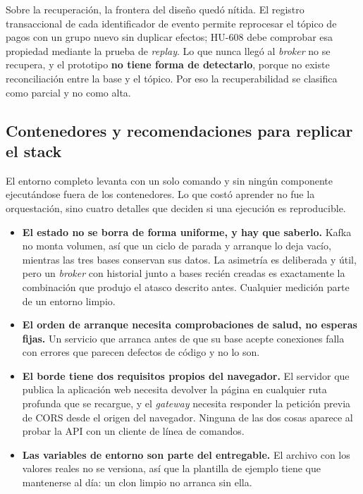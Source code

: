 \documentclass[12pt,a4paper]{article}
\begin{document}
Sobre la recuperación, la frontera del diseño quedó nítida. El registro transaccional de cada identificador de evento permite reprocesar el tópico de pagos con un grupo nuevo sin duplicar efectos; HU-608 debe comprobar esa propiedad mediante la prueba de \textit{replay}. Lo que nunca llegó al \textit{broker} no se recupera, y el prototipo \textbf{no tiene forma de detectarlo}, porque no existe reconciliación entre la base y el tópico. Por eso la recuperabilidad se clasifica como parcial y no como alta.

\subsection{Contenedores y recomendaciones para replicar el stack}

El entorno completo levanta con un solo comando y sin ningún componente ejecutándose fuera de los contenedores. Lo que costó aprender no fue la orquestación, sino cuatro detalles que deciden si una ejecución es reproducible.

\begin{itemize}[leftmargin=*]
    \item \textbf{El estado no se borra de forma uniforme, y hay que saberlo.} Kafka no monta volumen, así que un ciclo de parada y arranque lo deja vacío, mientras las tres bases conservan sus datos. La asimetría es deliberada y útil, pero un \textit{broker} con historial junto a bases recién creadas es exactamente la combinación que produjo el atasco descrito antes. Cualquier medición parte de un entorno limpio.
    \item \textbf{El orden de arranque necesita comprobaciones de salud, no esperas fijas.} Un servicio que arranca antes de que su base acepte conexiones falla con errores que parecen defectos de código y no lo son.
    \item \textbf{El borde tiene dos requisitos propios del navegador.} El servidor que publica la aplicación web necesita devolver la página en cualquier ruta profunda que se recargue, y el \textit{gateway} necesita responder la petición previa de CORS desde el origen del navegador. Ninguna de las dos cosas aparece al probar la API con un cliente de línea de comandos.
    \item \textbf{Las variables de entorno son parte del entregable.} El archivo con los valores reales no se versiona, así que la plantilla de ejemplo tiene que mantenerse al día: un clon limpio no arranca sin ella.
\end{itemize}
\end{document}

